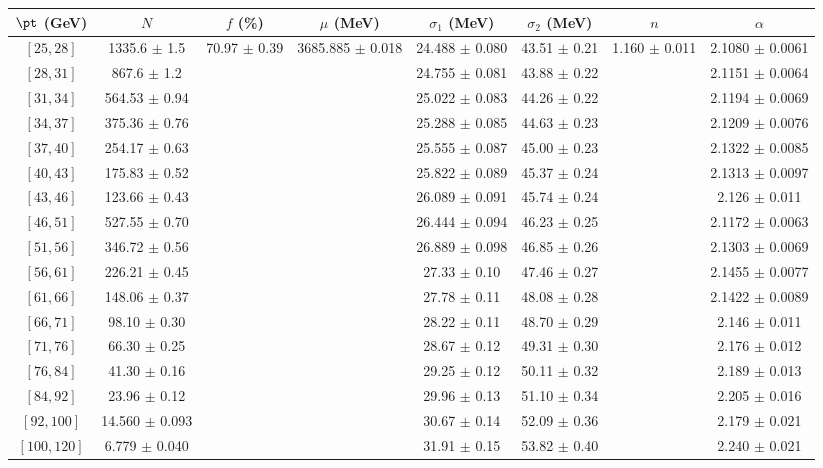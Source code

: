 \begin{tabular}{c||c|c|c|c|c|c|c}
$\pt$ (GeV) & $N$ & $f$ (\%) & $\mu$ (MeV) & $\sigma_1$ (MeV) & $\sigma_2$ (MeV) & $n$ & $\alpha$ \\
\hline
$[25, 28]$ & 1335.6 $\pm$ 1.5 & \multirow{17}{*}{70.97 $\pm$ 0.39} & \multirow{17}{*}{3685.885 $\pm$ 0.018} & 24.488 $\pm$ 0.080 & 43.51 $\pm$ 0.21 & \multirow{17}{*}{1.160 $\pm$ 0.011} & 2.1080 $\pm$ 0.0061\\
$[28, 31]$ & 867.6 $\pm$ 1.2 &  &  & 24.755 $\pm$ 0.081 & 43.88 $\pm$ 0.22 &  & 2.1151 $\pm$ 0.0064\\
$[31, 34]$ & 564.53 $\pm$ 0.94 &  &  & 25.022 $\pm$ 0.083 & 44.26 $\pm$ 0.22 &  & 2.1194 $\pm$ 0.0069\\
$[34, 37]$ & 375.36 $\pm$ 0.76 &  &  & 25.288 $\pm$ 0.085 & 44.63 $\pm$ 0.23 &  & 2.1209 $\pm$ 0.0076\\
$[37, 40]$ & 254.17 $\pm$ 0.63 &  &  & 25.555 $\pm$ 0.087 & 45.00 $\pm$ 0.23 &  & 2.1322 $\pm$ 0.0085\\
$[40, 43]$ & 175.83 $\pm$ 0.52 &  &  & 25.822 $\pm$ 0.089 & 45.37 $\pm$ 0.24 &  & 2.1313 $\pm$ 0.0097\\
$[43, 46]$ & 123.66 $\pm$ 0.43 &  &  & 26.089 $\pm$ 0.091 & 45.74 $\pm$ 0.24 &  & 2.126 $\pm$ 0.011\\
$[46, 51]$ & 527.55 $\pm$ 0.70 &  &  & 26.444 $\pm$ 0.094 & 46.23 $\pm$ 0.25 &  & 2.1172 $\pm$ 0.0063\\
$[51, 56]$ & 346.72 $\pm$ 0.56 &  &  & 26.889 $\pm$ 0.098 & 46.85 $\pm$ 0.26 &  & 2.1303 $\pm$ 0.0069\\
$[56, 61]$ & 226.21 $\pm$ 0.45 &  &  & 27.33 $\pm$ 0.10 & 47.46 $\pm$ 0.27 &  & 2.1455 $\pm$ 0.0077\\
$[61, 66]$ & 148.06 $\pm$ 0.37 &  &  & 27.78 $\pm$ 0.11 & 48.08 $\pm$ 0.28 &  & 2.1422 $\pm$ 0.0089\\
$[66, 71]$ & 98.10 $\pm$ 0.30 &  &  & 28.22 $\pm$ 0.11 & 48.70 $\pm$ 0.29 &  & 2.146 $\pm$ 0.011\\
$[71, 76]$ & 66.30 $\pm$ 0.25 &  &  & 28.67 $\pm$ 0.12 & 49.31 $\pm$ 0.30 &  & 2.176 $\pm$ 0.012\\
$[76, 84]$ & 41.30 $\pm$ 0.16 &  &  & 29.25 $\pm$ 0.12 & 50.11 $\pm$ 0.32 &  & 2.189 $\pm$ 0.013\\
$[84, 92]$ & 23.96 $\pm$ 0.12 &  &  & 29.96 $\pm$ 0.13 & 51.10 $\pm$ 0.34 &  & 2.205 $\pm$ 0.016\\
$[92, 100]$ & 14.560 $\pm$ 0.093 &  &  & 30.67 $\pm$ 0.14 & 52.09 $\pm$ 0.36 &  & 2.179 $\pm$ 0.021\\
$[100, 120]$ & 6.779 $\pm$ 0.040 &  &  & 31.91 $\pm$ 0.15 & 53.82 $\pm$ 0.40 &  & 2.240 $\pm$ 0.021\\
\end{tabular}

